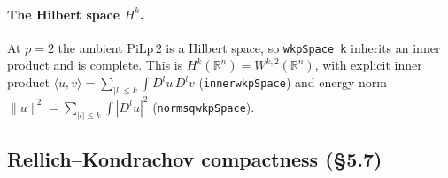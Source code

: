 ﻿\documentclass[12pt, a4paper]{article}
\renewcommand{\_}{\origunderscore\allowbreak}
\theoremstyle{definition}
\theoremstyle{plain}
\begin{document}
\paragraph{The Hilbert space $H^k$.}  At $p=2$ the ambient $\mathrm{PiLp}\,2$ is a Hilbert space, so
\texttt{wkpSpace k} inherits an inner product and is complete.  This is
$H^k(\mathbb{R}^n)=W^{k,2}(\mathbb{R}^n)$, with explicit inner product
$\langle u,v\rangle=\sum_{|l|\le k}\int D^l u\,D^l v$ (\texttt{inner\_wkpSpace}) and energy norm
$\|u\|^2=\sum_{|l|\le k}\int |D^l u|^2$ (\texttt{norm\_sq\_wkpSpace}).

\subsection{Rellich--Kondrachov compactness (§5.7)}
\end{document}
